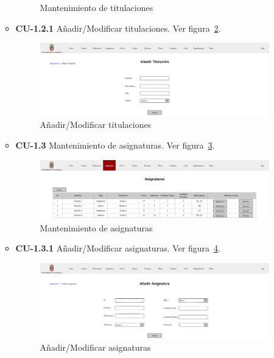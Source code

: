 \begin{itemize}
\begin{itemize}
\begin{figure}[!h]
		\caption{Mantenimiento de titulaciones}\label{F-CU1_2}
		\end{figure}
		\FloatBarrier
		\item \textbf{CU-1.2.1} Añadir/Modificar titulaciones. Ver figura~\ref{F-CU1_2_1}.
		\begin{figure}[!h]
		\centering
		\includegraphics[width=\textwidth]{../img/Anexos/Vistas/add_titulacion.png}
		\caption{Añadir/Modificar titulaciones}\label{F-CU1_2_1}
		\end{figure}
		\FloatBarrier
\newpage
		\item \textbf{CU-1.3} Mantenimiento de asignaturas. Ver figura~\ref{F-CU1_3}.
		\begin{figure}[!h]
		\centering
		\includegraphics[width=\textwidth]{../img/Anexos/Vistas/asignaturas.png}
		\caption{Mantenimiento de asignaturas}\label{F-CU1_3}
		\end{figure}
		\FloatBarrier
		\item \textbf{CU-1.3.1} Añadir/Modificar asignaturas. Ver figura~\ref{F-CU1_3_1}.
		\begin{figure}[!h]
		\centering
		\includegraphics[width=\textwidth]{../img/Anexos/Vistas/add_asignatura.png}
		\caption{Añadir/Modificar asignaturas}\label{F-CU1_3_1}
		\end{figure}
		\FloatBarrier
	\end{itemize}
	

\end{itemize}
